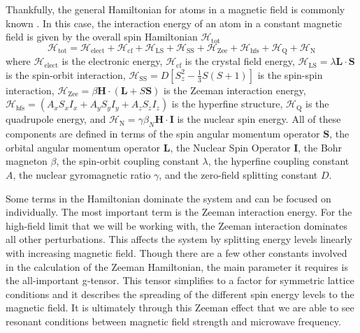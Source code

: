 \documentclass[oneside, noacknowlegments]{BYUPhys}
\begin{document}
Thankfully, the general Hamiltonian for atoms in a magnetic field is commonly known \cite{RefWorks:doc:58929c15e4b0228a29292c58} \cite{RefWorks:doc:589295bde4b0d4c09201f692}. In this case, the interaction energy of an atom in a constant magnetic field is given by the overall spin Hamiltonian $\mathcal{H}_{\text{tot}}$ \cite{RefWorks:doc:589293f5e4b0dec22aee39de} $$\mathcal{H}_{\text{tot}} = \mathcal{H}_{\text{elect}} + \mathcal{H}_{\text{cf}} + \mathcal{H}_{\text{LS}} + \mathcal{H}_{\text{SS}} + \mathcal{H}_{\text{Zee}} + \mathcal{H}_{\text{hfs}} + \mathcal{H}_{\text{Q}} + \mathcal{H}_{\text{N}}$$ where $\mathcal{H}_{\text{elect}}$ is the electronic energy, $\mathcal{H}_{\text{cf}}$ is the crystal field energy, $\mathcal{H}_{\text{LS}} = \lambda \mathbf{L} \cdot \mathbf{S}$ is the spin-orbit interaction, $\mathcal{H}_{\text{SS}} = D \left[ S_{z}^{2} - \frac{1}{3} S (S+1) \right]$ is the spin-spin interaction, $\mathcal{H}_{\text{Zee}} = \beta \mathbf{H} \cdot (\mathbf{L}+S\mathbf{S})$ is the Zeeman interaction energy, $\mathcal{H}_{\text{hfs}} = \left(A_xS_xI_x + A_yS_yI_y + A_zS_zI_z\right)$ is the hyperfine structure, $\mathcal{H}_{\text{Q}}$ is the quadrupole energy, and $\mathcal{H}_{\text{N}} = \gamma \beta_{N} \mathbf{H} \cdot \mathbf{I}$ is the nuclear spin energy. All of these components are defined in terms of the spin angular momentum operator $\mathbf{S}$, the orbital angular momentum operator $\mathbf{L}$, the Nuclear Spin Operator $\mathbf{I}$, the Bohr magneton $\beta$, the spin-orbit coupling constant $\lambda$, the hyperfine coupling constant $A$, the nuclear gyromagnetic ratio $\gamma$, and the zero-field splitting constant $D$.

Some terms in the Hamiltonian dominate the system and can be focused on individually. The most important term is the Zeeman interaction energy. For the high-field limit that we will be working with, the Zeeman interaction dominates all other perturbations. This affects the system by splitting energy levels linearly with increasing magnetic field. Though there are a few other constants involved in the calculation of the Zeeman Hamiltonian, the main parameter it requires is the all-important g-tensor. This tensor simplifies to a factor for symmetric lattice conditions and it describes the spreading of the different spin energy levels to the magnetic field. It is ultimately through this Zeeman effect that we are able to see resonant conditions between magnetic field strength and microwave frequency.
\end{document}
